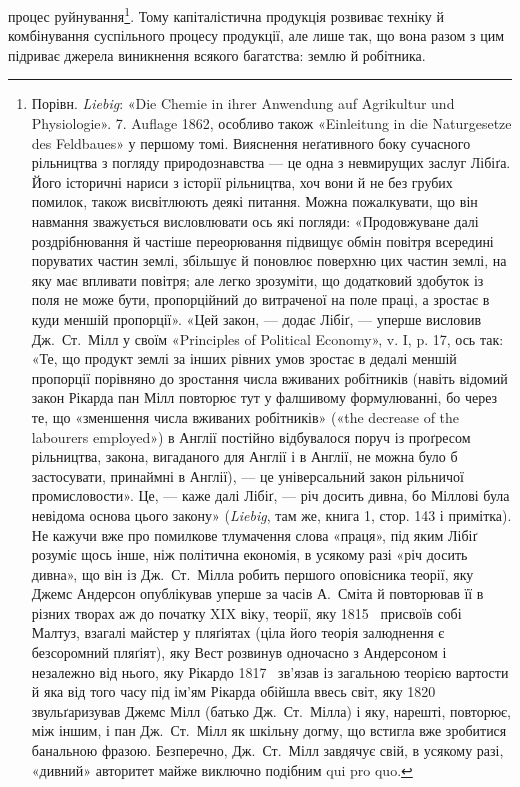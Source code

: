 процес руйнування\footnote{
Порівн. \emph{Liebig}: «Die Chemie in ihrer Anwendung auf Agrikultur
und Physiologie». 7. Auflage 1862, особливо також «Einleitung
in die Naturgesetze des Feldbaues» у першому томі. Вияснення неґативного
боку сучасного рільництва з погляду природознавства — це одна
з невмирущих заслуг Лібіґа. Його історичні нариси з історії рільництва,
хоч вони й не без грубих помилок, також висвітлюють деякі питання.
Можна пожалкувати, що він навмання зважується висловлювати
ось які погляди: «Продовжуване далі роздрібнювання й частіше переорювання
підвищує обмін повітря всередині поруватих частин землі, збільшує
й поновлює поверхню цих частин землі, на яку має впливати повітря;
але легко зрозуміти, що додатковий здобуток із поля не може бути,
пропорційний до витраченої на поле праці, а зростає в куди меншій пропорції».
«Цей закон, — додає Лібіґ, — уперше висловив Дж.~Ст.~Мілл у своїм
«Principles of Political Economy», v. I, p. 17, ось так: «Те, що продукт
землі за інших рівних умов зростає в дедалі меншій пропорції порівняно
до зростання числа вживаних робітників (навіть відомий закон Рікарда
пан Мілл повторює тут у фалшивому формулюванні, бо через те, що «зменшення
числа вживаних робітників» («the decrease of the labourers employed»)
в Англії постійно відбувалося поруч із проґресом рільництва, закона,
вигаданого для Англії і в Англії, не можна було б застосувати, принаймні
в Англії), — це універсальний закон рільничої промисловости». Це, — каже
далі Лібіґ, — річ досить дивна, бо Міллові була невідома основа цього закону»
(\emph{Liebig}, там же, книга 1, стор. 143 і примітка). Не кажучи вже про
помилкове тлумачення слова «праця», під яким Лібіґ розуміє щось інше,
ніж політична економія, в усякому разі «річ досить дивна», що він із Дж.~Ст.~Мілла робить першого оповісника теорії, яку Джемс Андерсон опублікував
уперше за часів А.~Сміта й повторював її в різних творах аж до
початку XIX віку, теорії, яку 1815~ присвоїв собі Малтуз, взагалі
майстер у пляґіятах (ціла його теорія залюднення є безсоромний пляґіят),
яку Вест розвинув одночасно з Андерсоном і незалежно від нього,
яку Рікардо 1817~ зв’язав із загальною теорією вартости й яка від
того часу під ім’ям Рікарда обійшла ввесь світ, яку 1820~ звульґаризував
Джемс Мілл (батько Дж.~Ст.~Мілла) і яку, нарешті, повторює, між
іншим, і пан Дж.~Ст.~Мілл як шкільну догму, що встигла вже зробитися
банальною фразою. Безперечно, Дж.~Ст.~Мілл завдячує свій, в усякому
разі, «дивний» авторитет майже виключно подібним qui pro quo.
}. Тому капіталістична продукція розвиває
техніку й комбінування суспільного процесу продукції, але
лише так, що вона разом з цим підриває джерела виникнення
всякого багатства: землю й робітника.


